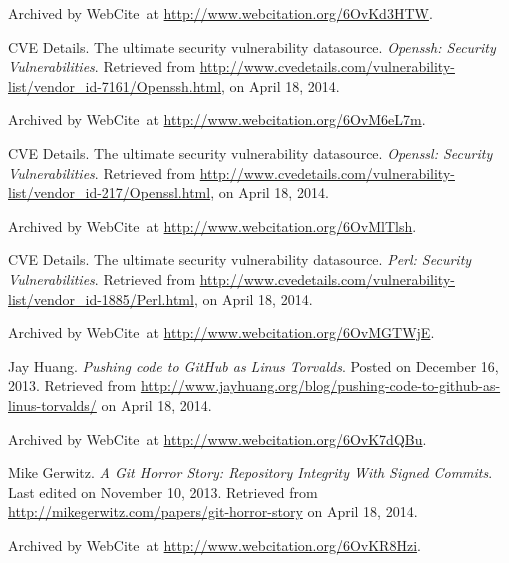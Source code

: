 \begin{thebibliography}{9}
Archived by WebCite\textsuperscript{\textregistered}\ at
\url{http://www.webcitation.org/6OvKd3HTW}.


CVE Details. The ultimate security vulnerability datasource. \emph{Openssh:
Security Vulnerabilities}. Retrieved from
\url{http://www.cvedetails.com/vulnerability-list/vendor_id-7161/Openssh.html},
on April 18, 2014.

Archived by WebCite\textsuperscript{\textregistered}\ at
\url{http://www.webcitation.org/6OvM6eL7m}.


CVE Details. The ultimate security vulnerability datasource. \emph{Openssl:
Security Vulnerabilities}. Retrieved from
\url{http://www.cvedetails.com/vulnerability-list/vendor_id-217/Openssl.html},
on April 18, 2014.

Archived by WebCite\textsuperscript{\textregistered}\ at
\url{http://www.webcitation.org/6OvMlTlsh}.


CVE Details. The ultimate security vulnerability datasource. \emph{Perl:
Security Vulnerabilities}. Retrieved from
\url{http://www.cvedetails.com/vulnerability-list/vendor_id-1885/Perl.html}, on
April 18, 2014.

Archived by WebCite\textsuperscript{\textregistered}\ at
\url{http://www.webcitation.org/6OvMGTWjE}.


Jay Huang. \emph{Pushing code to GitHub as Linus Torvalds}. Posted on December
16, 2013. Retrieved from
\url{http://www.jayhuang.org/blog/pushing-code-to-github-as-linus-torvalds/} on
April 18, 2014.

Archived by WebCite\textsuperscript{\textregistered}\ at
\url{http://www.webcitation.org/6OvK7dQBu}.


Mike Gerwitz. \emph{A Git Horror Story: Repository Integrity With Signed
Commits}. Last edited on November 10, 2013. Retrieved from
\url{http://mikegerwitz.com/papers/git-horror-story} on April 18, 2014.

Archived by WebCite\textsuperscript{\textregistered}\ at
\url{http://www.webcitation.org/6OvKR8Hzi}.



\end{thebibliography}

